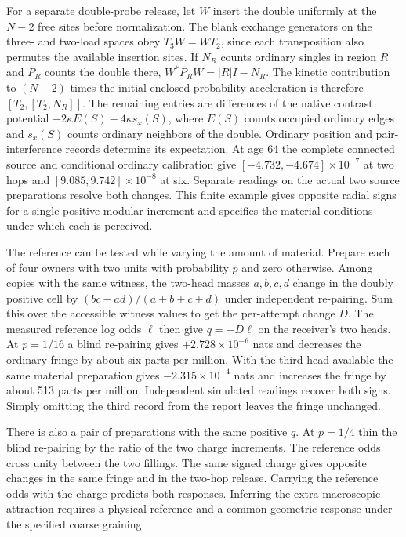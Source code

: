 \documentclass[11pt]{article}
\begin{document}
For a separate double-probe release, let $W$ insert the double
uniformly at the $N-2$ free sites before normalization. The blank
exchange generators on the three- and two-load spaces obey
$T_3W=WT_2$, since each transposition also permutes the available
insertion sites. If $N_R$ counts ordinary singles in region $R$ and
$P_R$ counts the double there, $W^*P_RW=|R|I-N_R$. The kinetic
contribution to $(N-2)$ times the initial enclosed probability
acceleration is therefore $[T_2,[T_2,N_R]]$. The remaining entries
are differences of the native contrast potential
$-2\kappa E(S)-4\kappa s_x(S)$, where $E(S)$ counts occupied
ordinary edges and $s_x(S)$ counts ordinary neighbors of the double.
Ordinary position and pair-interference records determine its
expectation. At age 64 the complete connected source and conditional
ordinary calibration give $[-4.732,-4.674]\times10^{-7}$ at two
hops and $[9.085,9.742]\times10^{-8}$ at six. Separate readings on
the actual two source preparations resolve both changes. This finite
example gives opposite radial signs for a single positive modular
increment and specifies the material conditions under which each
is perceived.

The reference can be tested while varying the amount of material.
Prepare each of four owners with two units with probability $p$
and zero otherwise. Among copies with the same witness, the two-head
masses $a,b,c,d$ change in the doubly positive cell by
$(bc-ad)/(a+b+c+d)$ under independent re-pairing. Sum this over the
accessible witness values to get the per-attempt change $D$.
The measured reference log odds $\ell$ then give $q=-D\ell$ on
the receiver's two heads. At $p=1/16$ a blind re-pairing gives
$+2.728\times10^{-6}$ nats and decreases the ordinary fringe
by about six parts per million. With the third head available the
same material preparation gives $-2.315\times10^{-4}$ nats and
increases the fringe by about 513 parts per million. Independent
simulated readings recover both signs. Simply omitting the third
record from the report leaves the fringe unchanged.

There is also a pair of preparations with the same positive $q$.
At $p=1/4$ thin the blind re-pairing by the ratio of the two charge
increments. The reference odds cross unity between the two fillings.
The same signed charge gives opposite changes in the same fringe
and in the two-hop release. Carrying the reference odds with the
charge predicts both responses. Inferring the extra macroscopic
attraction requires a physical reference and a common geometric
response under the specified coarse graining.
\end{document}
